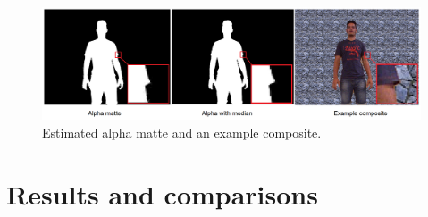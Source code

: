 \begin{figure}[t!]
\centering
\includegraphics[width=1\columnwidth]{Chapter6/6/post_work.png}
\caption[Estimated alpha matte and an example composite.]{Estimated alpha matte and an example composite.}
\label{fig:post-work}
\end{figure}

\section{Results and comparisons}
\label{sec:comparisons-app}

